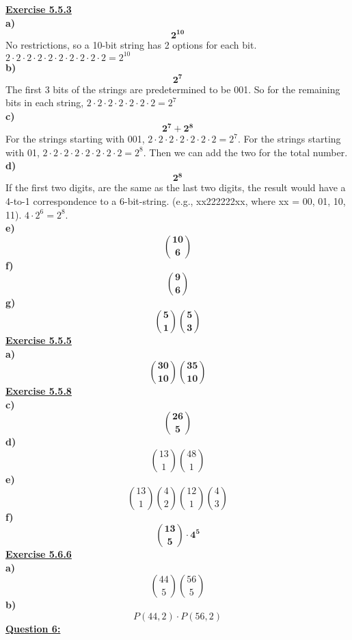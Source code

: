 \documentclass[12pt, letterpaper, twoside]{article}
\begin{document}
\break
\textbf{\underline{Exercise 5.5.3}}\\
\break
\textbf{a)} \\
\[\mathbf{2^{10}}\]
\indent No restrictions, so a 10-bit string has 2 options for each bit. $2 \cdot 2 \cdot 2 \cdot 2 \cdot 2 \cdot 2 \cdot 2 \cdot 2 \cdot 2 \cdot 2 = 2^{10}$\\
\break
\textbf{b)} \\
\[\mathbf{2^7}\]
\indent The first 3 bits of the strings are predetermined to be 001. So for the remaining bits in each string, $2 \cdot 2 \cdot 2 \cdot 2 \cdot 2 \cdot 2 \cdot 2 = 2^{7}$\\
\break
\textbf{c)} \\
\[\mathbf{2^7 + 2^8}\]
\indent For the strings starting with 001, $2 \cdot 2 \cdot 2 \cdot 2 \cdot 2 \cdot 2 \cdot 2 = 2^{7}$. For the strings starting with 01, $2 \cdot 2 \cdot 2 \cdot 2 \cdot 2 \cdot 2 \cdot 2 \cdot 2 = 2^{8}$. Then we can add the two for the total number.\\
\break
\textbf{d)} \\
\[\mathbf{2^8}\]
\indent If the first two digits, are the same as the last two digits, the result would have a 4-to-1 correspondence to a 6-bit-string. (e.g., xx222222xx, where xx = {00, 01, 10, 11}). $4 \cdot 2^6 = 2^8.$\\
\break
\textbf{e)} \\
\[\mathbf{\binom{10}{6}}\]
\break
\textbf{f)} \\
\[\mathbf{\binom{9}{6}}\]
\break
\textbf{g)} \\
\[\mathbf{\binom{5}{1}\binom{5}{3}}\]
\break
\textbf{\underline{Exercise 5.5.5}}\\
\break
\textbf{a)} \\
\[\mathbf{\binom{30}{10}\binom{35}{10}}\]
\break
\textbf{\underline{Exercise 5.5.8}}\\
\break
\textbf{c)}\\
\[\mathbf{\binom{26}{5}}\]
\break
\textbf{d)}\\
\[\binom{13}{1}\binom{48}{1}\]
\break
\textbf{e)}\\
\[\binom{13}{1} \binom{4}{2} \binom{12}{1} \binom{4}{3}\]
\break
\textbf{f)}\\
\[\mathbf{\binom{13}{5}\cdot4^5}\]
\newpage\noindent\textbf{\underline{Exercise 5.6.6}}\\
\break
\textbf{a)}\\
\[\binom{44}{5}\binom{56}{5}\]
\break
\textbf{b)}\\
\[P(44,2)\cdot P(56,2)\]
\break
\newpage\noindent \textbf{\underline{Question 6:}}\\
\end{document}
